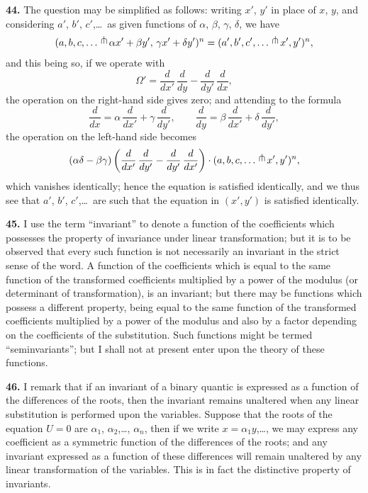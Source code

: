 \documentclass[11pt,a4paper]{book}
\begin{document}
\textbf{44.} The question may be simplified as follows: writing $x'$, $y'$ in place of $x$, $y$, and considering $a'$, $b'$, $c'$,\ldots\ as given functions of $\alpha$, $\beta$, $\gamma$, $\delta$, we have
\[
(a,b,c,\ldots\,\raisebox{0.5ex}{$\pitchfork$}\, \alpha x'+\beta y',\, \gamma x'+\delta y')^{n}
 = (a',b',c',\ldots\,\raisebox{0.5ex}{$\pitchfork$}\, x',y')^{n},
\]
and this being so, if we operate with
\[
\Omega'=\frac{d}{dx'}\,\frac{d}{dy}-\frac{d}{dy'}\,\frac{d}{dx},
\]
the operation on the right-hand side gives zero; and attending to the formula
\[
\frac{d}{dx}=\alpha\,\frac{d}{dx'}+\gamma\,\frac{d}{dy'},\qquad
\frac{d}{dy}=\beta\,\frac{d}{dx'}+\delta\,\frac{d}{dy'},
\]
the operation on the left-hand side becomes
\[
(\alpha\delta-\beta\gamma)
\left(\frac{d}{dx'}\,\frac{d}{dy'}-\frac{d}{dy'}\,\frac{d}{dx'}\right)
\cdot(a,b,c,\ldots\,\raisebox{0.5ex}{$\pitchfork$}\, x',y')^{n},
\]
which vanishes identically; hence the equation is satisfied identically, and we thus see that $a'$, $b'$, $c'$,\ldots\ are such that the equation in $(x',y')$ is satisfied identically.

\clearpage
\setcounter{page}{267}

\textbf{45.} I use the term ``invariant'' to denote a function of the coefficients which possesses the property of invariance under linear transformation; but it is to be observed that every such function is not necessarily an invariant in the strict sense of the word. A function of the coefficients which is equal to the same function of the transformed coefficients multiplied by a power of the modulus (or determinant of transformation), is an invariant; but there may be functions which possess a different property, being equal to the same function of the transformed coefficients multiplied by a power of the modulus and also by a factor depending on the coefficients of the substitution. Such functions might be termed ``seminvariants''; but I shall not at present enter upon the theory of these functions.

\textbf{46.} I remark that if an invariant of a binary quantic is expressed as a function of the differences of the roots, then the invariant remains unaltered when any linear substitution is performed upon the variables. Suppose that the roots of the equation $U=0$ are $\alpha_{1}$, $\alpha_{2}$,\ldots, $\alpha_{n}$, then if we write $x=\alpha_{1}y$,\ldots, we may express any coefficient as a symmetric function of the differences of the roots; and any invariant expressed as a function of these differences will remain unaltered by any linear transformation of the variables. This is in fact the distinctive property of invariants.
\end{document}
